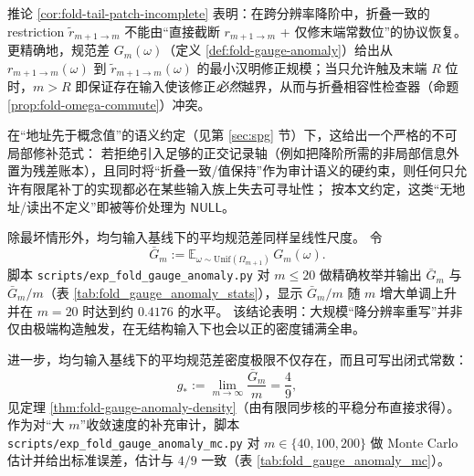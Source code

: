 \begin{remark}\label{rem:fold-tail-patch-null-nonlocal}
推论 \ref{cor:fold-tail-patch-incomplete} 表明：在跨分辨率降阶中，折叠一致的 restriction \(\widetilde r_{m+1\to m}\) 不能由“直接截断 \(r_{m+1\to m}\) + 仅修末端常数位”的协议恢复。
更精确地，规范差 \(G_m(\omega)\)（定义 \ref{def:fold-gauge-anomaly}）给出从 \(r_{m+1\to m}(\omega)\) 到 \(\widetilde r_{m+1\to m}(\omega)\) 的最小汉明修正规模；当只允许触及末端 \(R\) 位时，\(m>R\) 即保证存在输入使该修正\emph{必然}越界，从而与折叠相容性检查器（命题 \ref{prop:fold-omega-commute}）冲突。
\par
在“地址先于概念值”的语义约定（见第 \ref{sec:spg} 节）下，这给出一个严格的不可局部修补范式：
若拒绝引入足够的正交记录轴（例如把降阶所需的非局部信息外置为残差账本），且同时将“折叠一致/值保持”作为审计语义的硬约束，则任何只允许有限尾补丁的实现都必在某些输入族上失去可寻址性；
按本文约定，这类“无地址/读出不定义”即被等价处理为 \(\mathsf{NULL}\)。
\end{remark}

\begin{remark}\label{rem:fold-gauge-anomaly-typical}
除最坏情形外，均匀输入基线下的平均规范差同样呈线性尺度。
令
$$
\bar G_m:=\mathbb{E}_{\omega\sim\mathrm{Unif}(\Omega_{m+1})}\,G_m(\omega).
$$
脚本 \texttt{scripts/exp\_fold\_gauge\_anomaly.py} 对 \(m\le 20\) 做精确枚举并输出 \(\bar G_m\) 与 \(\bar G_m/m\)（表 \ref{tab:fold_gauge_anomaly_stats}），显示 \(\bar G_m/m\) 随 \(m\) 增大单调上升并在 \(m=20\) 时达到约 \(0.4176\) 的水平。
该结论表明：大规模“降分辨率重写”并非仅由极端构造触发，在无结构输入下也会以正的密度铺满全串。
\par
进一步，均匀输入基线下的平均规范差密度极限不仅存在，而且可写出闭式常数：
\[
g_\ast:=\lim_{m\to\infty}\frac{\bar G_m}{m}=\frac49,
\]
见定理 \ref{thm:fold-gauge-anomaly-density}（由有限同步核的平稳分布直接求得）。
作为对“大 \(m\)”收敛速度的补充审计，脚本 \texttt{scripts/exp\_fold\_gauge\_anomaly\_mc.py} 对 \(m\in\{40,100,200\}\) 做 Monte Carlo 估计并给出标准误差，估计与 \(4/9\) 一致（表 \ref{tab:fold_gauge_anomaly_mc}）。
\end{remark}





